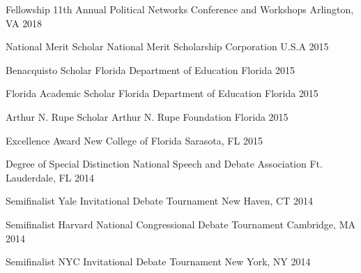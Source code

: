 

\begin{cvhonors}

  \cvhonor
    {Fellowship} %
    {11th Annual Political Networks Conference and Workshops} %
    {Arlington, VA} %
    {2018} %

  \cvhonor
    {National Merit Scholar} %
    {National Merit Scholarship Corporation} %
    {U.S.A} %
    {2015} %

  \cvhonor
    {Benacquisto Scholar} %
    {Florida Department of Education} %
    {Florida} %
    {2015} %

  \cvhonor
    {Florida Academic Scholar} %
    {Florida Department of Education} %
    {Florida} %
    {2015} %

  \cvhonor
    {Arthur N. Rupe Scholar} %
    {Arthur N. Rupe Foundation} %
    {Florida} %
    {2015} %

  \cvhonor
    {Excellence Award} %
    {New College of Florida} %
    {Sarasota, FL} %
    {2015} %

  \cvhonor
    {Degree of Special Distinction} %
    {National Speech and Debate Association} %
    {Ft. Lauderdale, FL} %
    {2014} %

  \cvhonor
    {Semifinalist} %
    {Yale Invitational Debate Tournament} %
    {New Haven, CT} %
    {2014} %

  \cvhonor
    {Semifinalist} %
    {Harvard National Congressional Debate Tournament} %
    {Cambridge, MA} %
    {2014} %

  \cvhonor
    {Semifinalist} %
    {NYC Invitational Debate Tournament} %
    {New York, NY} %
    {2014} %



\end{cvhonors}
